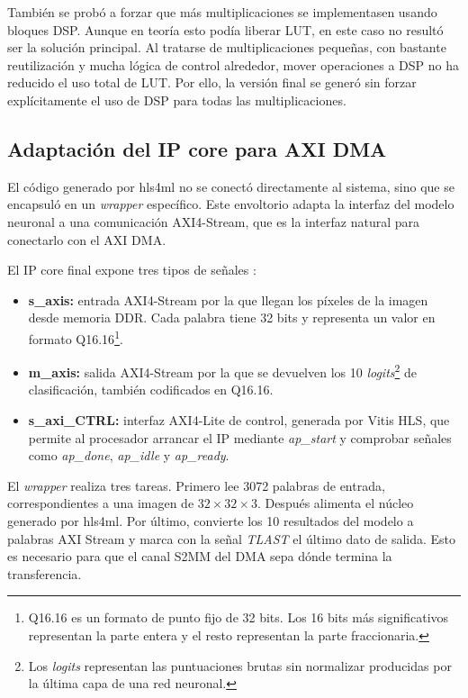 También se probó a forzar que más multiplicaciones se implementasen usando bloques \ac{DSP}.
Aunque en teoría esto podía liberar \ac{LUT}, en este caso no resultó ser la solución principal.
Al tratarse de multiplicaciones pequeñas, con bastante reutilización y mucha lógica de control
alrededor, mover operaciones a \ac{DSP} no ha reducido el uso total de \ac{LUT}. Por
ello, la versión
final se generó sin forzar explícitamente el uso de \ac{DSP} para todas las multiplicaciones.

\subsection{Adaptación del IP core para AXI DMA}
El código generado por hls4ml no se conectó directamente al sistema, sino que se
encapsuló en un \textit{wrapper} específico.
Este envoltorio adapta la interfaz del modelo neuronal a una comunicación AXI4-Stream,
que es la interfaz natural para conectarlo con el \ac{AXI} \ac{DMA}.

El \ac{IP} core final expone tres tipos de señales \citep{amdAxiDma}:

\begin{itemize}
  \item \textbf{s\_axis:} entrada AXI4-Stream por la que llegan los píxeles de la imagen
    desde memoria \ac{DDR}. Cada palabra tiene 32 bits y representa un valor en formato
    Q16.16\footnote{Q16.16 es un formato de punto fijo de 32 bits. Los 16 bits más
    significativos representan la parte entera y el resto representan la parte fraccionaria.}.
  \item \textbf{m\_axis:} salida AXI4-Stream por la que se devuelven los 10
    \textit{logits}\footnote{Los \textit{logits} representan las puntuaciones brutas sin
    normalizar producidas por la última capa de una red neuronal.} de
    clasificación, también codificados en Q16.16.
  \item \textbf{s\_axi\_CTRL:} interfaz AXI4-Lite de control, generada por Vitis \ac{HLS},
    que permite al procesador arrancar el \ac{IP} mediante \textit{ap\_start} y comprobar
    señales como \textit{ap\_done}, \textit{ap\_idle} y \textit{ap\_ready}.
\end{itemize}

El \textit{wrapper} realiza tres tareas. Primero lee 3072 palabras de entrada,
correspondientes a una imagen de $32 \times 32 \times 3$.
Después alimenta el núcleo generado por hls4ml. Por último, convierte los 10 resultados
del modelo a palabras \ac{AXI} Stream y marca con la señal \textit{TLAST} el último dato de salida.
Esto es necesario para que el canal \ac{S2MM} del \ac{DMA} sepa dónde termina la transferencia.

